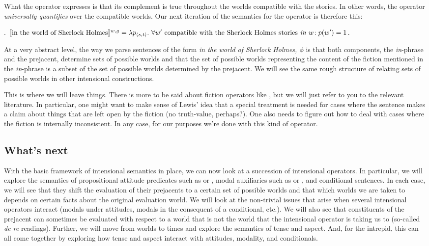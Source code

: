 What the operator  expresses is that
its complement is true throughout the worlds compatible with the stories. In
other words, the operator \emph{universally quantifies} over the compatible
worlds. Our next iteration of the semantics for the operator is therefore this:

\ex. $\llbracket \mbox{in the world of Sherlock Holmes} \rrbracket^{w,g} =\\
\lambda p_{\langle s,t \rangle}.\ \forall w' \mbox{ compatible with the Sherlock Holmes stories \emph{in} } w\!:\\
p(w') = 1$.

At a very abstract level, the way we parse sentences of the form \emph{in the
  world of Sherlock Holmes, $\phi$} is that both components, the
\emph{in}-phrase and the prejacent, determine sets of possible worlds and that
the set of possible worlds representing the content of the fiction mentioned in
the \emph{in}-phrase is a subset of the set of possible worlds determined by the
prejacent. We will see the same rough structure of relating sets of possible
worlds in other intensional constructions.

This is where we will leave things. There is more to be said about fiction
operators like , but we will just
refer to you to the relevant literature. In particular, one might want to make
sense of Lewis' idea that a special treatment is needed for cases where the
sentence makes a claim about things that are left open by the fiction (no
truth-value, perhaps?). One also needs to figure out how to deal with cases
where the fiction is internally inconsistent. In any case, for our purposes
we're done with this kind of operator.

\subsection{What's next}
\label{sec:next}

With the basic framework of intensional semantics in place, we can now look at a
succession of intensional operators. In particular, we will explore the
semantics of propositional attitude predicates such as  or
, modal auxiliaries such as  or
, and conditional sentences. In each case, we will see that
they shift the evaluation of their prejacents to a certain set of possible
worlds and that which worlds we are taken to depends on certain facts about the
original evaluation world. We will look at the non-trivial issues that arise
when several intensional operators interact (modals under attitudes, modals in
the consequent of a conditional, etc.). We will also see that constituents of
the prejacent can sometimes be evaluated with respect to a world that is not the
world that the intensional operator is taking us to (so-called \emph{de re}
readings). Further, we will move from worlds to times and explore the semantics
of tense and aspect. And, for the intrepid, this can all come together by
exploring how tense and aspect interact with attitudes, modality, and
conditionals.

